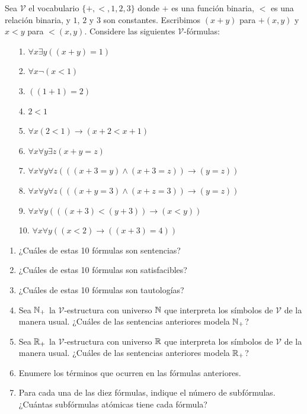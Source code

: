 \message{ !name(main.tex)}\documentclass[12pt,a4paper]{book}
\newcommand{\VV}{\mathcal{V}}
\begin{document}
    \begin{ejercicio}\label{ej:vocab-aritmetico-varios}
        Sea $\VV$ el vocabulario $\{+,<,1,2,3\}$ donde $+$ es una función binaria, $<$ es una relación binaria, y $1$, $2$
        y $3$ son constantes. Escribimos $(x+y)$ para $+(x,y)$ y $x<y$ para $<(x,y)$. Considere las siguientes
        $\VV$-fórmulas:
        \begin{enumerate}
            \item[1.] $\forall x\exists y((x+y)=1)$
            \item[2.] $\forall x\neg(x<1)$
            \item[3.] $((1+1)=2)$
            \item[4.] $2<1$
            \item[5.] $\forall x(2<1)\rightarrow(x+2<x+1)$
            \item[6.] $\forall x\forall y\exists z(x+y=z)$
            \item[7.] $\forall x\forall y\forall z(((x+3=y)\wedge(x+3=z))\rightarrow(y=z))$
            \item[8.] $\forall x\forall y\forall z(((x+y=3)\wedge(x+z=3))\rightarrow(y=z))$
            \item[9.] $\forall x\forall y(((x+3)<(y+3))\rightarrow(x<y))$
            \item[10.] $\forall x\forall y((x<2)\rightarrow((x+3)=4))$
        \end{enumerate}
        \begin{enumerate}[label=(\alph*)]
            \item ¿Cuáles de estas 10 fórmulas son sentencias?
            \item ¿Cuáles de estas 10 fórmulas son satisfacibles?
            \item ¿Cuáles de estas 10 fórmulas son tautologías?
            \item Sea $\mathbb{N}_{+}$ la $\VV$-estructura con universo $\mathbb{N}$ que interpreta los símbolos de $\VV$ de la manera
            usual. ¿Cuáles de las sentencias anteriores modela $\mathbb{N}_{+}$?
            \item Sea $\mathbb{R}_{+}$ la $\VV$-estructura con universo $\mathbb{R}$ que interpreta los símbolos de $\VV$ de la manera
            usual. ¿Cuáles de las sentencias anteriores modela $\mathbb{R}_{+}$?
            \item Enumere los términos que ocurren en las fórmulas anteriores.
            \item Para cada una de las diez fórmulas, indique el número de subfórmulas. ¿Cuántas subfórmulas atómicas
            tiene cada fórmula?
        \end{enumerate}
    \end{ejercicio}
\end{document}

